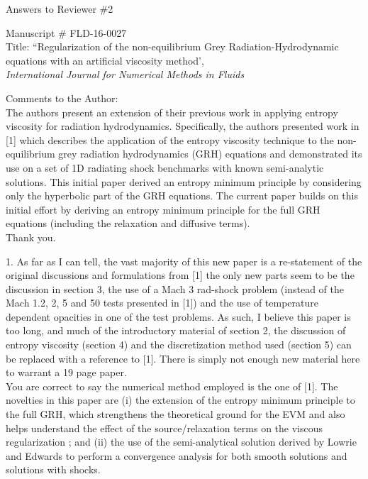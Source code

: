 \documentclass{article}
\begin{document}
\begin{center}
{ \Large Answers to Reviewer \#2}
\end{center}

\bigskip

\noindent Manuscript \# FLD-16-0027 \\
Title: ``Regularization of the non-equilibrium Grey Radiation-Hydrodynamic equations with an artificial viscosity method', \\
{\it International Journal for Numerical Methods in Fluids}\\

\bigskip

{\color{blue}
Comments to the Author: \\ 
The authors present an extension of their previous work in applying entropy viscosity for radiation hydrodynamics. Specifically, the authors presented work in [1] which describes the application of the entropy viscosity technique to the non-equilibrium grey radiation hydrodynamics (GRH) equations and demonstrated its use on a set of 1D radiating shock benchmarks with known semi-analytic solutions. This initial paper derived an entropy minimum principle by considering only the hyperbolic part of the GRH equations. The current paper builds on this initial effort by deriving an entropy minimum principle for the full GRH equations (including the relaxation and diffusive terms).\\}
Thank you.
\bigskip

{\color{blue}
1. As far as I can tell, the vast majority of this new paper is a re-statement of the original discussions and formulations from [1]  the only new parts seem to be the discussion in section 3, the use of a Mach 3 rad-shock problem (instead of the Mach 1.2, 2, 5 and 50 tests presented in [1]) and the use of temperature dependent opacities in one of the test problems. As such, I believe this paper is too long, and much of the introductory material of section 2, the discussion of entropy viscosity (section 4) and the discretization method used (section 5) can be replaced with a reference to [1]. There is simply not enough new material here to warrant a 19 page paper. \\}
%
You are correct to say the numerical method employed is the one of [1]. The novelties in this paper are (i) the extension of the entropy minimum principle to the full GRH, which strengthens the theoretical ground for the EVM and also helps understand the effect of the source/relaxation terms on the viscous regularization ; and (ii) the use of the semi-analytical solution derived by Lowrie and Edwards to perform a convergence analysis for both smooth solutions and solutions with shocks. 
\end{document}

